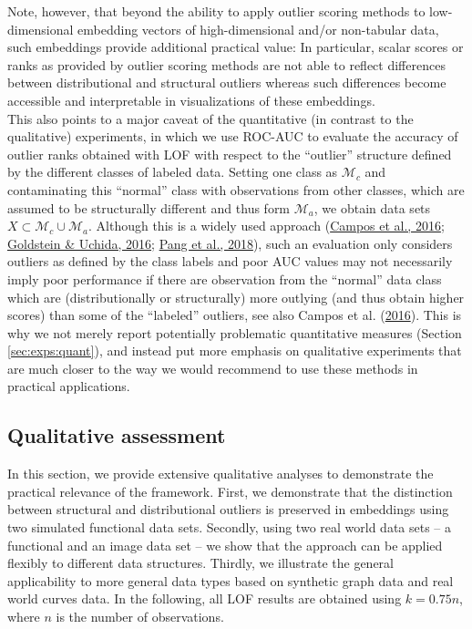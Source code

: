 \documentclass[
  10pt]{article}
\newcommand{\co}{c}
\newcommand{\an}{a}
\newcommand{\Min}{\mathcal{M}_{\co}}
\newcommand{\Man}{\mathcal{M}_{\an}}
\begin{document}
Note, however, that beyond the ability to apply outlier scoring methods to low-dimensional embedding vectors of high-dimensional and/or non-tabular data, such embeddings provide additional practical value:
In particular, scalar scores or ranks as provided by outlier scoring methods are not able to reflect differences between distributional and structural outliers whereas such differences become accessible and interpretable in visualizations of these embeddings.\\
This also points to a major caveat of the quantitative (in contrast to the qualitative) experiments, in which we use ROC-AUC to evaluate the accuracy of outlier ranks obtained with LOF with respect to the ``outlier'' structure defined by the different classes of labeled data. Setting one class as \(\Min\) and contaminating this ``normal'' class with
observations from other classes, which are assumed to be structurally different and thus form \(\Man\), we obtain data sets \(X \subset \Min \cup \Man\). Although this is a widely used approach (\protect\hyperlink{ref-campos2016evaluation}{Campos et al., 2016}; \protect\hyperlink{ref-goldstein2016comparative}{Goldstein \& Uchida, 2016}; \protect\hyperlink{ref-pang2018learning}{Pang et al., 2018}), such an evaluation only considers outliers as defined by the class labels and poor AUC values may not necessarily imply poor performance if there are observation from the ``normal'' data class which are (distributionally or structurally) more outlying (and thus obtain higher scores) than some of the ``labeled'' outliers, see also Campos et al. (\protect\hyperlink{ref-campos2016evaluation}{2016}). This is why we not merely report potentially problematic quantitative measures (Section \ref{sec:exps:quant}), and instead put more emphasis on qualitative experiments that are much closer to the way we would recommend to use these methods in practical applications.

\subsection{Qualitative assessment}\label{sec:exps:qual}

In this section, we provide extensive qualitative analyses to demonstrate the practical relevance of the framework. First, we demonstrate that the distinction between structural and distributional outliers is preserved in embeddings using two simulated functional data sets. Secondly, using two real world data sets -- a functional and an image data set -- we show that the approach can be applied flexibly to different data structures. Thirdly, we illustrate the general applicability to more general data types based on synthetic graph data and real world curves data. In the following, all LOF results are obtained using \(k = 0.75n\), where \(n\) is the number of observations.
\end{document}
